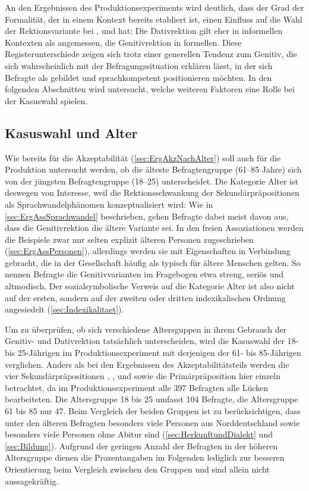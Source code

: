 An den Ergebnissen des Produktionsexperiments wird deutlich, dass der Grad der Formalität, der in einem Kontext bereits etabliert ist, einen Einfluss auf die Wahl der Rektionsvariante bei \wegen{}, \waehrend{} und \dank{} hat: 
Die Dativrektion gilt eher in informellen Kontexten als angemessen, die Genitivrektion in formellen. 
Diese Registerunterschiede zeigen sich trotz einer generellen 
Tendenz zum Genitiv, die sich wahrscheinlich mit der Befragungssituation erklären lässt, in der sich Befragte als gebildet und sprachkompetent positionieren möchten.
In den folgenden Abschnitten wird untersucht, welche weiteren Faktoren eine Rolle bei der Kasuswahl spielen. 
\subsection{Kasuswahl und Alter}
\label{sec:ErgProdNachAlter}
Wie bereits für die Akzeptabilität (\autoref{sec:ErgAkzNachAlter}) soll auch für die Produktion untersucht werden, ob die älteste Befragtengruppe (61--85 Jahre) sich von der jüngsten Befragtengruppe (18--25) unterscheidet. 
Die Kategorie \glqq Alter\grqq{} ist deswegen von Interesse, weil die Rektionsschwankung der Sekundärpräpositionen als Sprachwandelphänomen konzeptualisiert wird: 
Wie in \autoref{sec:ErgAssSprachwandel} beschrieben, gehen Befragte dabei meist davon aus, dass die Genitivrektion die ältere Variante sei.
In den freien Assoziationen werden die Beispiele zwar nur selten explizit älteren Personen zugeschrieben (\autoref{sec:ErgAssPersonen}), allerdings werden sie mit Eigenschaften in Verbindung gebracht, die in der Gesellschaft häufig als typisch für ältere Menschen gelten. 
So nennen Befragte die Genitivvarianten im Fragebogen etwa streng, seriös und altmodisch.  
Der sozialsymbolische Verweis auf die Kategorie \glqq Alter\grqq{} ist also nicht auf der ersten, sondern auf der zweiten oder dritten indexikalischen Ordnung angesiedelt (\autoref{sec:Indexikalitaet}). 

Um zu überprüfen, ob sich verschiedene Altersguppen in ihrem Gebrauch der Genitiv- und Dativrektion tatsächlich unterscheiden, wird die Kasuswahl der 18- bis 25-Jährigen im Produktionsexperiment mit derjenigen der 61- bis 85-Jährigen verglichen. 
Anders als bei den Ergebnissen des Akzeptabilitätsteils werden die vier Sekundärpräpositionen \wegen, \waehrend, \dank{} und \gegenueber{} sowie die Primärpräposition  hier einzeln betrachtet, da im Produktionsexperiment alle 397 Befragten alle Lücken bearbeiteten. 
Die Altersgruppe 18 bis 25 umfasst 104 Befragte, die Altersgruppe 61 bis 85 nur 47. 
Beim Vergleich der beiden Gruppen ist zu berücksichtigen, dass unter den älteren Befragten besonders viele Personen aus Norddeutschland sowie besonders viele Personen ohne Abitur sind (\autoref{sec:HerkunftundDialekt} und \autoref{sec:Bildung}). 
Aufgrund der geringen Anzahl der Befragten in der höheren Altersgruppe dienen die Prozentangaben im Folgenden lediglich zur besseren Orientierung beim Vergleich zwischen den Gruppen und sind allein nicht aussagekräftig. 

